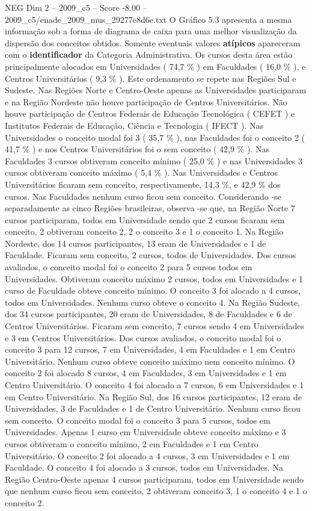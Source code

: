 \begin{textsample}{NEG Dim 2 – 2009\_c5 – Score -8.00 – 2009\_c5/enade\_2009\_mus\_29277e8d6e.txt}
O Gráfico 5.3 apresenta a mesma informação sob a forma de diagrama de caixa para uma melhor visualização da dispersão dos conceitos obtidos.
Somente eventuais valores \textbf{atípicos} apareceram com o \textbf{identificador} da Categoria Administrativa.
Os cursos desta área estão principalmente alocados em Universidades ( 74,7 \% ) em Faculdades ( 16,0 \% ), e Centros Universitários ( 9,3 \% ).
Este ordenamento se repete nas Regiões Sul e Sudeste.
Nas Regiões Norte e Centro-Oeste apenas as Universidades participaram e na Região Nordeste não houve participação de Centros Universitários.
Não houve participação de Centros Federais de Educação Tecnológica ( CEFET ) e Institutos Federais de Educação, Ciência e Tecnologia ( IFECT ).
Nas Universidades o conceito modal foi 3 ( 35,7 \% ), nas Faculdades foi o conceito 2 ( 41,7 \% ) e nos Centros Universitários foi o sem conceito ( 42,9 \% ).
Nas Faculdades 3 cursos obtiveram conceito mínimo ( 25,0 \% ) e nas Universidades 3 cursos obtiveram conceito máximo ( 5,4 \% ).
Nas Universidades e Centros Universitários ficaram sem conceito, respectivamente, 14,3 \%, e 42,9 \% dos cursos.
Nas Faculdades nenhum curso ficou sem conceito.
Considerando -se separadamente as cinco Regiões brasileiras, observa -se que, na Região Norte 7 cursos participaram, todos em Universidade sendo que 2 cursos ficaram sem conceito, 2 obtiveram conceito 2, 2 o conceito 3 e 1 o conceito 1.
Na Região Nordeste, dos 14 cursos participantes, 13 eram de Universidades e 1 de Faculdade.
Ficaram sem conceito, 2 cursos, todos de Universidades.
Dos cursos avaliados, o conceito modal foi o conceito 2 para 5 cursos todos em Universidades.
Obtiveram conceito máximo 2 cursos, todos em Universidades e 1 curso de Faculdade obteve conceito mínimo.
O conceito 3 foi alocado a 4 cursos, todos em Universidades.
Nenhum curso obteve o conceito 4.
Na Região Sudeste, dos 34 cursos participantes, 20 eram de Universidades, 8 de Faculdades e 6 de Centros Universitários.
Ficaram sem conceito, 7 cursos sendo 4 em Universidades e 3 em Centros Universitários.
Dos cursos avaliados, o conceito modal foi o conceito 3 para 12 cursos, 7 em Universidades, 4 em Faculdades e 1 em Centro Universitário.
Nenhum curso obteve conceito máximo nem conceito mínimo.
O conceito 2 foi alocado 8 cursos, 4 em Faculdades, 3 em Universidades e 1 em Centro Universitário.
O conceito 4 foi alocado a 7 cursos, 6 em Universidades e 1 em Centro Universitário.
Na Região Sul, dos 16 cursos participantes, 12 eram de Universidades, 3 de Faculdades e 1 de Centro Universitário.
Nenhum curso ficou sem conceito.
O conceito modal foi o conceito 3 para 5 cursos, todos em Universidades.
Apenas 1 curso em Universidade obteve conceito máximo e 3 cursos obtiveram o conceito mínimo, 2 em Faculdades e 1 em Centro Universitário.
O conceito 2 foi alocado a 4 cursos, 3 em Universidades e 1 em Faculdade.
O conceito 4 foi alocado a 3 cursos, todos em Universidades.
Na Região Centro-Oeste apenas 4 cursos participaram, todos em Universidade sendo que nenhum curso ficou sem conceito, 2 obtiveram conceito 3, 1 o conceito 4 e 1 o conceito 2.

\end{textsample}
